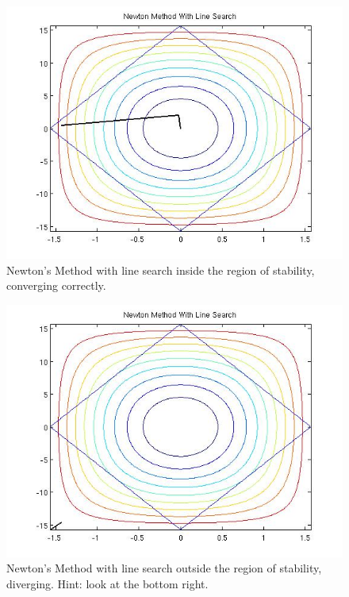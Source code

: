 \documentclass{article}
\begin{document}
\begin{figure}[!htb]
  \includegraphics[scale=.5]{figs/P1NMWLSwin.jpg}
  \caption{Newton's Method with line search inside the region of
 stability, converging correctly.}   
\end{figure}

\begin{figure}[!htb]
  \includegraphics[scale=.5]{figs/P1NMWLSFail.jpg}
  \caption{Newton's Method with line search outside the region of
 stability, diverging. Hint: look at the bottom right.}   
\end{figure}
\end{document}
